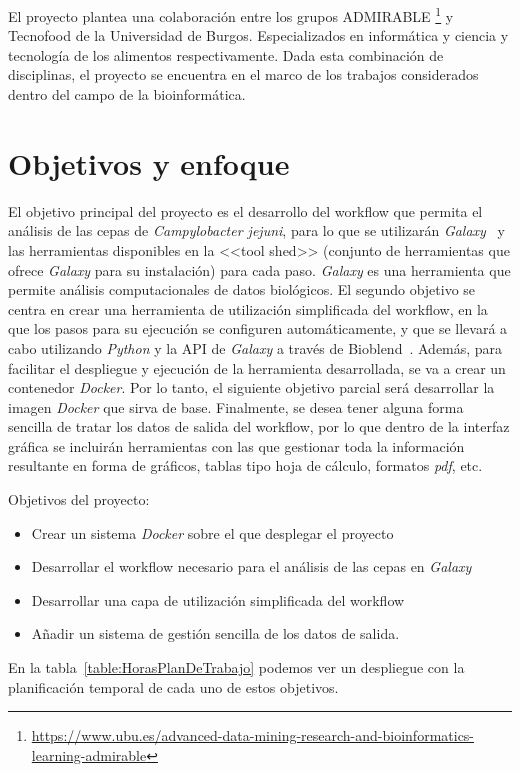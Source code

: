 El proyecto plantea una colaboración entre los grupos ADMIRABLE \footnote{\url{https://www.ubu.es/advanced-data-mining-research-and-bioinformatics-learning-admirable}} y Tecnofood de la Universidad de Burgos. Especializados en informática y ciencia y tecnología de los alimentos respectivamente. Dada esta combinación de disciplinas, el proyecto se encuentra en el marco de los trabajos considerados dentro del campo de la bioinformática.


\section{Objetivos y enfoque}
El objetivo principal del proyecto es el desarrollo del workflow que permita el análisis de las cepas de \textit{Campylobacter jejuni}, para lo que se utilizarán \textit{Galaxy}~\cite{afgan2018galaxy} y las herramientas disponibles en la <<tool shed>> (conjunto de herramientas que ofrece \textit{Galaxy} para su instalación) para cada paso. \textit{Galaxy} es una herramienta que permite análisis computacionales de datos biológicos. 
El segundo objetivo se centra en crear una herramienta de utilización simplificada del workflow, en la que los pasos para su ejecución se configuren automáticamente, y que se llevará a cabo utilizando \textit{Python} y la API de \textit{Galaxy} a través de Bioblend~\cite{Sloggett2013}. 
Además, para facilitar el despliegue y ejecución de la herramienta desarrollada, se va a crear un contenedor \textit{Docker}. Por lo tanto, el siguiente objetivo parcial será desarrollar la imagen \textit{Docker} que sirva de base.
Finalmente, se desea tener alguna forma sencilla de tratar los datos de salida del workflow, por lo que dentro de la interfaz gráfica se incluirán herramientas con las que gestionar toda la información resultante en forma de gráficos, tablas tipo hoja de cálculo, formatos \textit{pdf}, etc.

Objetivos del proyecto:
\begin{itemize}
\item Crear un sistema \textit{Docker} sobre el que desplegar el proyecto
\item Desarrollar el workflow necesario para el análisis de las cepas en \textit{Galaxy}
\item Desarrollar una capa de utilización simplificada del workflow
\item Añadir un sistema de gestión sencilla de los datos de salida.
\end{itemize}

En la tabla~\ref{table:HorasPlanDeTrabajo} podemos ver un despliegue con la planificación temporal de cada uno de estos objetivos.

